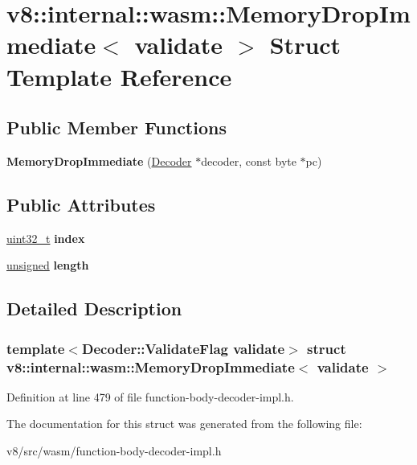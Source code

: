 \hypertarget{structv8_1_1internal_1_1wasm_1_1MemoryDropImmediate}{}\section{v8\+:\+:internal\+:\+:wasm\+:\+:Memory\+Drop\+Immediate$<$ validate $>$ Struct Template Reference}
\label{structv8_1_1internal_1_1wasm_1_1MemoryDropImmediate}
\subsection*{Public Member Functions}
\begin{DoxyCompactItemize}
\item 
\mbox{\label{structv8_1_1internal_1_1wasm_1_1MemoryDropImmediate_a75dd960e686b3a5c735e62e25657a3cc}} 
{\bfseries Memory\+Drop\+Immediate} (\mbox{\hyperlink{classv8_1_1internal_1_1wasm_1_1Decoder}{Decoder}} $\ast$decoder, const byte $\ast$pc)
\end{DoxyCompactItemize}
\subsection*{Public Attributes}
\begin{DoxyCompactItemize}
\item 
\mbox{\label{structv8_1_1internal_1_1wasm_1_1MemoryDropImmediate_a795c38599d3b783047b556e9e67f6e80}} 
\mbox{\hyperlink{classuint32__t}{uint32\+\_\+t}} {\bfseries index}
\item 
\mbox{\label{structv8_1_1internal_1_1wasm_1_1MemoryDropImmediate_ac64de6f11f2c54f2172cef433df41a4e}} 
\mbox{\hyperlink{classunsigned}{unsigned}} {\bfseries length}
\end{DoxyCompactItemize}


\subsection{Detailed Description}
\subsubsection*{template$<$Decoder\+::\+Validate\+Flag validate$>$\newline
struct v8\+::internal\+::wasm\+::\+Memory\+Drop\+Immediate$<$ validate $>$}



Definition at line 479 of file function-\/body-\/decoder-\/impl.\+h.



The documentation for this struct was generated from the following file\+:\begin{DoxyCompactItemize}
\item 
v8/src/wasm/function-\/body-\/decoder-\/impl.\+h\end{DoxyCompactItemize}
